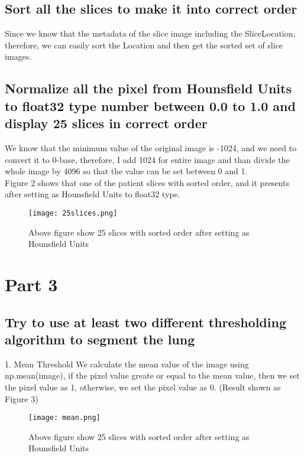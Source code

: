 \documentclass[a4paper,11pt]{article}
\begin{document}
\subsection{Sort all the slices to make it into correct order}
Since we know that the metadata of the slice image including the SliceLocation, therefore, we can easily sort the Location and then get the sorted set of slice images.

\subsection{Normalize all the pixel from Hounsfield Units to float32 type number between 0.0 to 1.0 and display 25 slices in correct order}

We know that the minimum value of the original image is -1024, and we need to convert it to 0-base, therefore, I add 1024 for entire image and than divide the whole image by 4096 so that the value can be set between 0 and 1. \\

Figure 2 shows that one of the patient slices with sorted order, and it presents after setting as Hounsfield Units to float32 type.


\begin{figure}[h]
\centering
\texttt{[image: 25slices.png]}
\caption{Above figure show 25 slices with sorted order after setting as Hounsfield Units}
\label{fig1}
\end{figure}

\pagebreak

\section{Part 3}

\subsection{Try to use at least two different thresholding algorithm to segment the lung}

1. Mean Threshold
We calculate the mean value of the image using np.mean(image), if the pixel value greate or equal to the mean value, then we set the pixel value as 1, otherwise, we set the pixel value as 0. (Result shown as Figure 3) 

\begin{figure}[h]
\centering
\texttt{[image: mean.png]}
\caption{Above figure show 25 slices with sorted order after setting as Hounsfield Units}
\label{fig1}
\end{figure}
\end{document}
